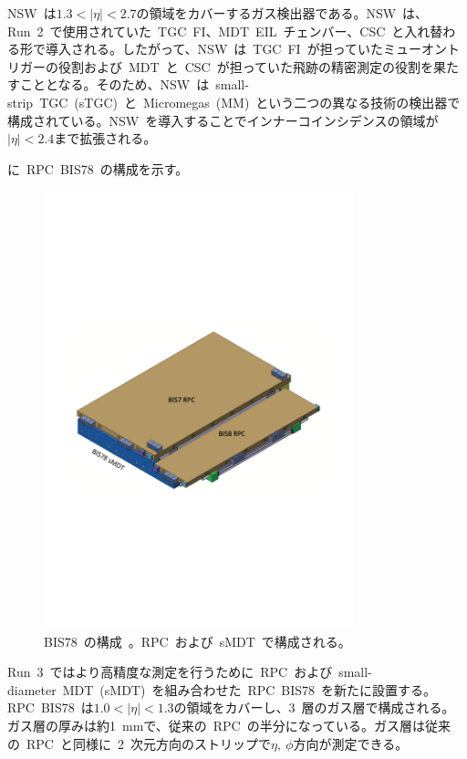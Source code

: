 NSW~は$1.3<|\eta|<2.7$の領域をカバーするガス検出器である。NSW~は、Run~2~で使用されていた~TGC~FI、MDT~EIL~チェンバー、CSC~と入れ替わる形で導入される。したがって、NSW~は~TGC~FI~が担っていたミューオントリガーの役割および~MDT~と~CSC~が担っていた飛跡の精密測定の役割を果たすこととなる。そのため、NSW~は~small-strip~TGC~(sTGC)~と~Micromegas~(MM)~という二つの異なる技術の検出器で構成されている。NSW~を導入することでインナーコインシデンスの領域が$|\eta|<2.4$まで拡張される。

に~RPC~BIS78~の構成を示す。
\begin{figure}[tbp]
        \centering   
        \includegraphics[width=0.8\textwidth,page=1]{img/pdf/bis.pdf}
        \caption[RPC~BIS78~の構成]{BIS78~の構成~\cite{TR:04}。RPC~および~sMDT~で構成される。}
        \label{fig:bis}
\end{figure}
Run~3~ではより高精度な測定を行うために~RPC~および~small-diameter~MDT~(sMDT)~を組み合わせた~RPC~BIS78~を新たに設置する。RPC~BIS78~は$1.0<|\eta|<1.3$の領域をカバーし、3~層のガス層で構成される。ガス層の厚みは約1~mmで、従来の~RPC~の半分になっている。ガス層は従来の~RPC~と同様に~2~次元方向のストリップで$\eta,~\phi$方向が測定できる。

